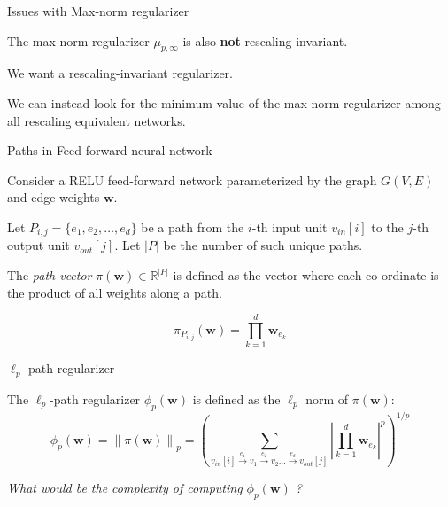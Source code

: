 \documentclass[presentation,xcolor={usenames,dvipsnames},10pt]{beamer}
\newcommand{\norm}[1]{\left\lVert{#1}\right\rVert}
\newcommand{\vin}{v_{in}}
\newcommand{\vout}{v_{out}}
\begin{document}
\begin{frame}{Issues with Max-norm regularizer}
\bit 
\item The max-norm regularizer $\mu_{p,\infty}$ is also \textbf{not} rescaling invariant.

\item We want a rescaling-invariant regularizer. 

\item We can instead look for the minimum value of the max-norm regularizer among all rescaling equivalent networks. 
\eit

\end{frame}

\begin{frame}{Paths in Feed-forward neural network}

\begin{definition}
Consider a RELU feed-forward
network parameterized by the graph $G(V,E)$ and edge weights $\mathbf{w}$.

Let $P_{i,j} = \{e_1,e_2,\ldots,e_d\}$ be a path from the $i$-th input unit $v_{in}[i]$ to the $j$-th output unit $v_{out}[j]$. Let $|P|$ be the number of such unique paths. 

The {\em path vector} $\pi(\textbf{w}) \in \mathbb{R}^{|P|}$ is defined as the vector where each co-ordinate is the product of all weights along a path. 
 
$$\displaystyle \pi_{P_{i,j}}(\mathbf{w}) = \prod_{k=1}^d \mathbf{w}_{e_k}$$
\end{definition}
\end{frame}

\begin{frame}{$\ell_p$-path regularizer}
\begin{definition}
The $\ell_p$-path regularizer $\phi_p(\mathbf{w})$ is defined as the $\ell_p$ norm of
$\pi(\textbf{w})$:
\begin{equation}\label{eq:defphi}
\phi_p(\textbf{w}) = \norm{\pi(\textbf{w})}_p = 
\left(\sum_{\vin[i] \overset{e_1}\rightarrow v_1\overset{e_2}\rightarrow v_2\dots\overset{e_d}{\rightarrow}\vout[j]} \left|\prod_{k=1}^d \textbf{w}_{e_k}\right|^p\right)^{1/p}
\end{equation}

\end{definition}

\textit{What would be the complexity of computing $\phi_p(\mathbf{w})$ ? 
}
\end{frame}
\end{document}
